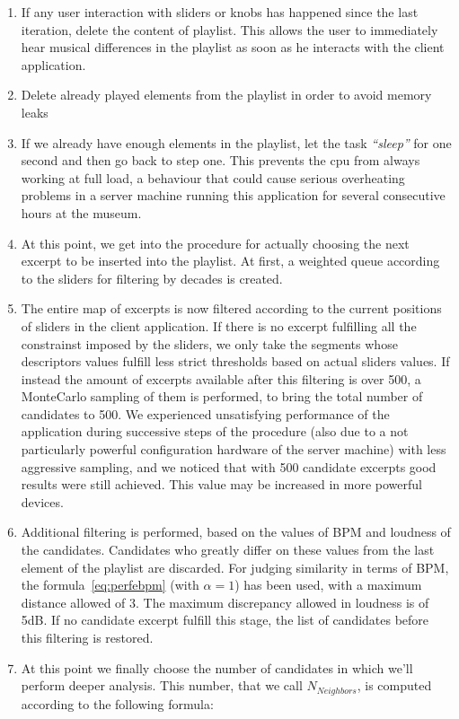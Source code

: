 \begin{enumerate}
\item If any user interaction with sliders or knobs has happened since the last iteration, delete the content of playlist. This allows the user to immediately hear musical differences in the playlist as soon as he interacts with the client application. 
\item Delete already played elements from the playlist in order to avoid memory leaks
\item If we already have enough elements in the playlist, let the task \textit{``sleep''} for one second and then go back to step one. This prevents the cpu from always working at full load, a behaviour that could cause serious overheating problems in a server machine running this application for several consecutive hours at the museum.
\item At this point, we get into the procedure for actually choosing the next excerpt to be inserted into the playlist. At first, a weighted queue according to the sliders for filtering by decades is created.
\item The entire map of excerpts is now filtered according to the current positions of sliders in the client application. If there is no excerpt fulfilling all the constrainst imposed by the sliders, we only take the segments whose descriptors values fulfill less strict thresholds based on actual sliders values. If instead the amount of excerpts available after this filtering is over 500, a MonteCarlo sampling of them is performed, to bring the total number of candidates to 500. We experienced unsatisfying performance of the application during successive steps of the procedure (also due to a not particularly powerful configuration hardware of the server machine) with less aggressive sampling, and we noticed that with 500 candidate excerpts good results were still achieved. This value may be increased in more powerful devices. \
\item Additional filtering is performed, based on the values of BPM and loudness of the candidates. Candidates who greatly differ on these values from the last element of the playlist are discarded. For judging similarity in terms of BPM, the formula~\ref{eq:perfebpm} (with $\alpha = 1$) has been used, with a maximum distance allowed of 3. The maximum discrepancy allowed in loudness is of 5dB. If no candidate excerpt fulfill this stage, the list of candidates before this filtering is restored. 
\item At this point we finally choose the number of candidates in which we'll perform deeper analysis. This number, that we call $N_{Neighbors}$, is computed according to the following formula:

\end{enumerate}
